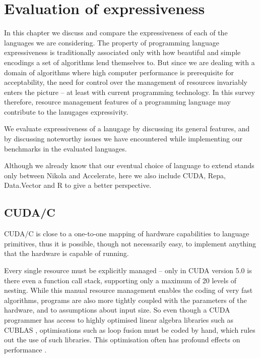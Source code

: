 \chapter{Evaluation of expressiveness}

In this chapter we discuss and compare the expressiveness of each of the
languages we are considering.  The property of programming language
expressiveness is traditionally associated only with how beautiful and simple
encodings a set of algorithms lend themselves to. But since we are dealing with
a domain of algorithms where high computer performance is prerequisite for
acceptability, the need for control over the management of resources invariably
enters the picture -- at least with current programming technology. In this
survey therefore, resource management features of a programming language may
contribute to the lanugages expressivity.

We evaluate expressiveness of a lanugage by discussing its general features,
and by discussing noteworthy issues we have encountered while implementing our
benchmarks in the evaluated languages.

Although we already know that our eventual choice of language to extend stands
only between Nikola and Accelerate, here we also include CUDA, Repa,
Data.Vector and R to give a better perspective.

\section{CUDA/C}
CUDA/C is close to a one-to-one mapping of hardware capabilities to language
primitives, thus it is possible, though not necessarily easy, to implement anything
that the hardware is capable of running.

Every single resource must be explicitly managed -- only in CUDA version 5.0 is
there even a function call stack, supporting only a maximum of 20 levels of
nesting.  While this manual resource management enables the coding of very fast
algorithms, programs are also more tightly coupled with the parameters of the
hardware, and to assumptions about input size. So even though a CUDA programmer
has access to highly optimised linear algebra libraries such as CUBLAS
\cite{CUBLAS2013}, optimisations such as loop fusion must be coded by hand,
which rules out the use of such libraries. This optimisation often has profound
effects on performance \cite{mainlandhaskell}.

